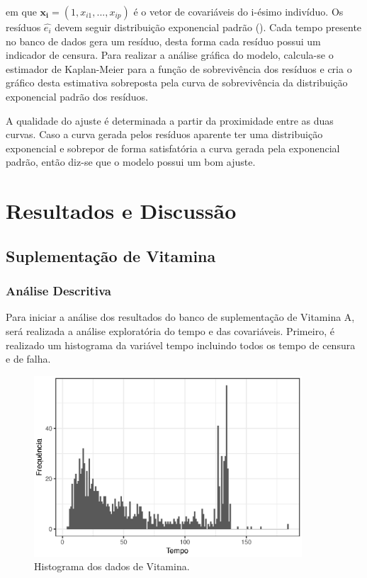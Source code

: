 \documentclass[a4paper,12pt]{article}
\newcommand*\NewPage{\newpage\null\newpage}
\begin{document}
em que $\boldsymbol{x_i} = (1, x_{i1}, ..., x_{ip})$ é o vetor de covariáveis do i-ésimo indivíduo.
Os resíduos $\hat{e_i}$ devem seguir distribuição exponencial padrão (\cite{Lawless}). Cada tempo presente no banco de dados gera um resíduo, desta forma cada resíduo possui um indicador de censura. Para realizar a análise gráfica do modelo, calcula-se o estimador de Kaplan-Meier para a função de sobrevivência dos resíduos e cria o gráfico desta estimativa sobreposta pela curva de sobrevivência da distribuição exponencial padrão dos resíduos.

A qualidade do ajuste é determinada a partir da proximidade entre as duas curvas. Caso a curva gerada pelos resíduos aparente ter uma distribuição exponencial e sobrepor de forma satisfatória a curva gerada pela exponencial padrão, então diz-se que o modelo possui um bom ajuste.


\NewPage\null

\section{Resultados e Discussão}

\subsection{Suplementação de Vitamina}
\subsubsection{Análise Descritiva}

Para iniciar a análise dos resultados do banco de suplementação de Vitamina A, será realizada a análise exploratória do tempo e das covariáveis. Primeiro, é realizado um histograma da variável tempo incluindo todos os tempo de censura e de falha.

\begin{figure}[H]
  \begin{center}
    \includegraphics[width=10cm]{hist_vit}
    \caption{Histograma dos dados de Vitamina.}
  \end{center}
\end{figure}
\end{document}
